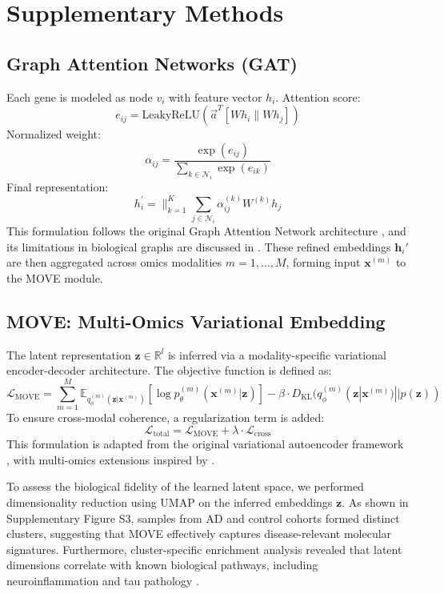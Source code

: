 \documentclass[12pt]{article}
\begin{document}
\section*{Supplementary Methods}

\subsection*{Graph Attention Networks (GAT)}

Each gene is modeled as node \( v_i \) with feature vector \( h_i \). Attention score:
\[
e_{ij} = \text{LeakyReLU}\left(\vec{a}^T \left[W h_i \parallel W h_j\right]\right)
\]
Normalized weight:
\[
\alpha_{ij} = \frac{\exp(e_{ij})}{\sum_{k \in \mathcal{N}_i} \exp(e_{ik})}
\]
Final representation:
\[
h_i^{'} = \parallel_{k=1}^K \sum_{j \in \mathcal{N}_i} \alpha_{ij}^{(k)} W^{(k)} h_j
\]
This formulation follows the original Graph Attention Network architecture \citep{velic}, and its limitations in biological graphs are discussed in \citep{xu2020gcn_limitations}. These refined embeddings \( \mathbf{h}_i' \) are then aggregated across omics modalities \( m = 1, \dots, M \), forming input \( \mathbf{x}^{(m)} \) to the MOVE module. 

\subsection*{MOVE: Multi-Omics Variational Embedding}

The latent representation \( \mathbf{z} \in \mathbb{R}^l \) is inferred via a modality-specific variational encoder-decoder architecture. The objective function is defined as:
\[
\mathcal{L}_{\text{MOVE}} = \sum_{m=1}^{M} \mathbb{E}_{q_\phi^{(m)}(\mathbf{z}|\mathbf{x}^{(m)})}[\log p_\theta^{(m)}(\mathbf{x}^{(m)}|\mathbf{z})] - \beta \cdot D_{\mathrm{KL}}(q_\phi^{(m)}(\mathbf{z}|\mathbf{x}^{(m)}) || p(\mathbf{z}))
\]
To ensure cross-modal coherence, a regularization term is added:
\[
\mathcal{L}_{\text{total}} = \mathcal{L}_{\text{MOVE}} + \lambda \cdot \mathcal{L}_{\text{cross}}
\]
This formulation is adapted from the original variational autoencoder framework \citep{kingma2014vae}, with multi-omics extensions inspired by \citep{wang2021move, allesoe2023move}.

To assess the biological fidelity of the learned latent space, we performed dimensionality reduction using UMAP on the inferred embeddings \( \mathbf{z} \). As shown in Supplementary Figure S3, samples from AD and control cohorts formed distinct clusters, suggesting that MOVE effectively captures disease-relevant molecular signatures. Furthermore, cluster-specific enrichment analysis revealed that latent dimensions correlate with known biological pathways, including neuroinflammation and tau pathology \citep{mcinnes2018umap, iturria2018multi}.
\end{document}

